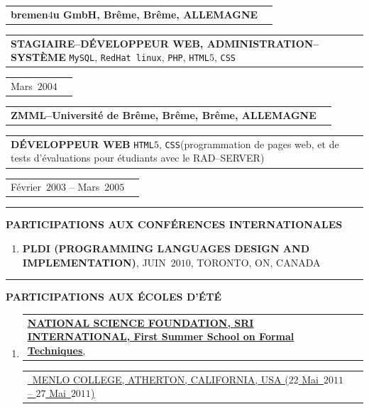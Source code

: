 \documentclass[9pt,a4paper]{article} %
\makeatletter
\newcommand{\headerrow}[2]
{\begin{tabular*}{\linewidth}{l@{\extracolsep{\fill}}r}
	#1 &
	#2 \\
\end{tabular*}}
\newcommand{\headerrowONE}[1]{\headerrow{#1}{}}
\newcommand{\css}{\texttt{CSS}\xspace}
\newcommand{\html}{\texttt{HTML$5$}\xspace}
\newcommand{\php}{\texttt{PHP}\xspace}
\newcommand{\mysql}{\texttt{MySQL}\xspace}
\newcommand{\redhat}{\texttt{RedHat~linux}\xspace}
\newcommand{\cvitemdate}[2]{#1~$#2$\xspace}
\newcommand{\cvitempositionheld}[1]{\textbf{#1}\xspace}
\makeatother
\begin{document}
\vspace{0.3em}

\headerrowONE{\textbf{bremen$4$u GmbH, Brême, Brême, ALLEMAGNE}}	
\headerrowONE{\cvitempositionheld{STAGIAIRE--DÉVELOPPEUR WEB, ADMINISTRATION--SYSTÈME} \mysql, \redhat, \php,
\html, \css}
\headerrowONE{\cvitemdate{Mars}{2004}}	
	
\vspace{0.3em}

\headerrowONE{\textbf{ZMML--Université de Brême, Brême, Brême, ALLEMAGNE}}	
\headerrowONE{\cvitempositionheld{DÉVELOPPEUR WEB} \html, \css (programmation de pages web,
et de tests d'évaluations pour étudiants avec le RAD--SERVER)}
\headerrowONE{\cvitemdate{Février}{2003} -- \cvitemdate{Mars}{2005}}	

\vspace{1em}


\hrule
\begin{center}
{\large \textbf{PARTICIPATIONS AUX CONFÉRENCES INTERNATIONALES}}
\end{center}

\vspace{0.5em}

\begin{enumerate}
	\item \textbf{PLDI (PROGRAMMING LANGUAGES DESIGN AND IMPLEMENTATION)},
		\cvitemdate{JUIN}{2010}, TORONTO, ON, CANADA

\end{enumerate}

\vspace{1em}


\hrule
\begin{center}
{\large \textbf{PARTICIPATIONS AUX ÉCOLES D'ÉTÉ}}
\end{center}

\vspace{0.5em}

\begin{enumerate}
	\item \headerrowONE{\href{http://fm.csl.sri.com/SSFT11/}{\textbf{NATIONAL SCIENCE FOUNDATION, SRI INTERNATIONAL, First Summer School on Formal Techniques},}}
			\headerrowONE{\href{http://fm.csl.sri.com/SSFT11}{\ \hfill  MENLO COLLEGE, ATHERTON, 
			CALIFORNIA, USA (\cvitemdate{$22$ Mai}{2011} -- \cvitemdate{$27$ Mai}{2011})}}

\end{enumerate}
\end{document}
